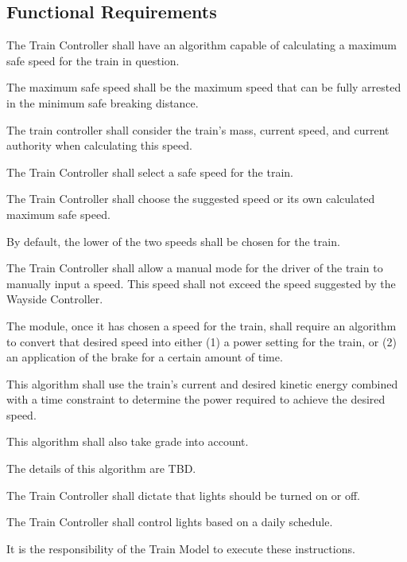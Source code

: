 \documentclass{scrreprt}
\begin{document}
\subsection{Functional Requirements}
\begin{numonly}
    \item The Train Controller shall have an algorithm capable of calculating a maximum safe speed for the train in question.
    \begin{numonly}
        \item The maximum safe speed shall be the maximum speed that can be fully arrested in the minimum safe breaking distance.
        \item The train controller shall consider the train's mass, current speed, and current authority when calculating this speed.
    \end{numonly}

    \item The Train Controller shall select a safe speed for the train.
    \begin{numonly}
        \item The Train Controller shall choose the suggested speed or its own calculated maximum safe speed.
        \item By default, the lower of the two speeds shall be chosen for the train.
        \item The Train Controller shall allow a manual mode for the driver of the train to manually input a speed.  This speed shall not exceed the speed suggested by the Wayside Controller.
    \end{numonly}

    \item The module, once it has chosen a speed for the train, shall require an algorithm to convert that desired speed into either (1) a power setting for the train, or (2) an application of the brake for a certain amount of time.
    \begin{numonly}
        \item This algorithm shall use the train's current and desired kinetic energy combined with a time constraint to determine the power required to achieve the desired speed.
        \item This algorithm shall also take grade into account.
        \item The details of this algorithm are TBD.
    \end{numonly}

    \item The Train Controller shall dictate that lights should be turned on or off.
    \begin{numonly}
        \item The Train Controller shall control lights based on a daily schedule.
        \item It is the responsibility of the Train Model to execute these instructions.
    \end{numonly}


\end{numonly}
\end{document}
